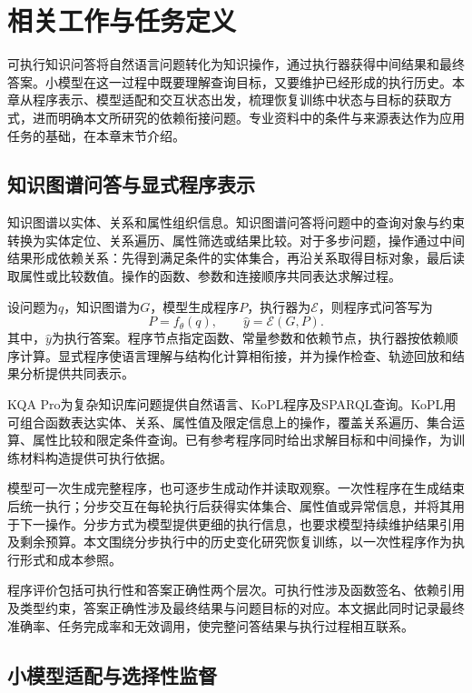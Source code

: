 \chapter{相关工作与任务定义}
\label{chap:background}

可执行知识问答将自然语言问题转化为知识操作，通过执行器获得中间结果和最终答案。小模型在这一过程中既要理解查询目标，又要维护已经形成的执行历史。本章从程序表示、模型适配和交互状态出发，梳理恢复训练中状态与目标的获取方式，进而明确本文所研究的依赖衔接问题。专业资料中的条件与来源表达作为应用任务的基础，在本章末节介绍。

\section{知识图谱问答与显式程序表示}

知识图谱以实体、关系和属性组织信息。知识图谱问答将问题中的查询对象与约束转换为实体定位、关系遍历、属性筛选或结果比较。对于多步问题，操作通过中间结果形成依赖关系：先得到满足条件的实体集合，再沿关系取得目标对象，最后读取属性或比较数值。操作的函数、参数和连接顺序共同表达求解过程。

设问题为$q$，知识图谱为$G$，模型生成程序$P$，执行器为$\mathcal E$，则程序式问答写为
\begin{equation}
 P=f_\theta(q),\qquad \hat y=\mathcal E(G,P).
\end{equation}
其中，$\hat y$为执行答案。程序节点指定函数、常量参数和依赖节点，执行器按依赖顺序计算。显式程序使语言理解与结构化计算相衔接，并为操作检查、轨迹回放和结果分析提供共同表示。

KQA Pro为复杂知识库问题提供自然语言、KoPL程序及SPARQL查询\cite{cao2022kqapro}。KoPL用可组合函数表达实体、关系、属性值及限定信息上的操作，覆盖关系遍历、集合运算、属性比较和限定条件查询。已有参考程序同时给出求解目标和中间操作，为训练材料构造提供可执行依据。

模型可一次生成完整程序，也可逐步生成动作并读取观察。一次性程序在生成结束后统一执行；分步交互在每轮执行后获得实体集合、属性值或异常信息，并将其用于下一操作。分步方式为模型提供更细的执行信息，也要求模型持续维护结果引用及剩余预算。本文围绕分步执行中的历史变化研究恢复训练，以一次性程序作为执行形式和成本参照。

程序评价包括可执行性和答案正确性两个层次。可执行性涉及函数签名、依赖引用及类型约束，答案正确性涉及最终结果与问题目标的对应。本文据此同时记录最终准确率、任务完成率和无效调用，使完整问答结果与执行过程相互联系。

\section{小模型适配与选择性监督}

